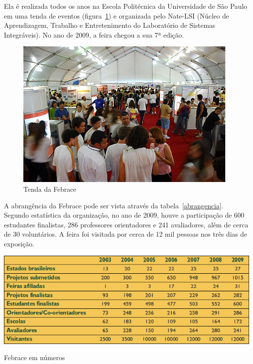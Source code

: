 Ela é realizada todos os anos na Escola Politécnica da Universidade de São Paulo em uma tenda de eventos (figura~\ref{febrace}) e organizada pelo Nate-LSI (Núcleo de Aprendizagem, Trabalho e Entretenimento do Laboratório de Sistemas Integráveis). No ano de 2009, a feira chegou a sua 7ª edição.

    \begin{figure}
        \begin{center}
    \includegraphics[width=1.0\linewidth]{arquivos/febrace.jpg}
        \end{center}
        \caption{Tenda da Febrace}
        \label{febrace}
    \end{figure}

A abrangência da Febrace pode ser vista através da tabela~\ref{abrangencia}. Segundo estatística da organização, no ano de 2009, houve a participação de 600 estudantes finalistas, 286 professores orientadores e 241 avaliadores, além de cerca de 30 voluntários. A feira foi visitada por cerca de 12 mil pessoas nos três dias de exposição. 

\begin{table}[h]
    \begin{center}
        \includegraphics[width=0.8\linewidth]{arquivos/abrangencia.png}
    \end{center}
    \caption{Febrace em números}
    \label{abrangencia}
\end{table}

